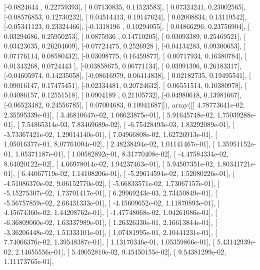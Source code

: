 \documentclass{article}
\begin{document}
       [-0.0824644 ,  0.22759393],
       [ 0.07130835,  0.11523583],
       [ 0.07324241,  0.23002565],
       [-0.08576853,  0.12730232],
       [ 0.04514413,  0.19147624],
       [ 0.02008834,  0.13119542],
       [-0.05341123,  0.23324466],
       [-0.1318196 ,  0.10294055],
       [ 0.04866296,  0.23756904],
       [ 0.03294686,  0.25950253],
       [ 0.0875936 ,  0.14710205],
       [ 0.03093389,  0.25469521],
       [ 0.03423635,  0.26204609],
       [-0.07724475,  0.2526928 ],
       [-0.04134283,  0.09300653],
       [ 0.07176114,  0.08580432],
       [-0.03098775,  0.16459877],
       [ 0.00717934,  0.16380784],
       [ 0.01343268,  0.0724443 ],
       [-0.03858675,  0.06771134],
       [ 0.03991396,  0.26183317],
       [-0.04605974,  0.14235058],
       [-0.08616979,  0.06414838],
       [ 0.02182735,  0.19495541],
       [ 0.09016147,  0.17475451],
       [-0.02334481,  0.20724632],
       [ 0.06551514,  0.10380978],
       [ 0.04086157,  0.12551518],
       [ 0.0904189 ,  0.21105732],
       [-0.04980618,  0.13981667],
       [-0.06523482,  0.24556785],
       [ 0.07004683,  0.10941687]]), array([[  4.78773641e-02,   2.35595339e-01],
       [  3.46810647e-02,   1.06623875e-01],
       [  5.91645748e-02,   1.75039288e-01],
       [  7.54865314e-03,   7.83469689e-02],
       [ -6.75428493e-03,   1.83292089e-01],
       [ -3.73367421e-02,   1.29014140e-01],
       [  7.04966808e-02,   1.62726913e-01],
       [  1.05016377e-01,   8.07761004e-02],
       [  2.48238494e-02,   1.01141467e-01],
       [  1.35951152e-01,   1.05371187e-01],
       [  1.00582892e-01,   8.31770408e-02],
       [ -4.47584334e-02,   8.64020122e-02],
       [  4.66978014e-02,   1.94237463e-01],
       [  5.94507351e-02,   1.80341721e-01],
       [  6.44067719e-02,   1.14108206e-01],
       [ -5.29614594e-02,   1.52080226e-01],
       [ -4.51086370e-02,   9.06152770e-02],
       [ -5.66833571e-02,   1.73067157e-01],
       [ -5.15275307e-02,   1.73701417e-01],
       [  6.29969243e-03,   2.73450849e-01],
       [ -5.56757859e-02,   2.66431333e-01],
       [ -4.15609652e-02,   1.11870893e-01],
       [  4.15674360e-02,   1.44208762e-01],
       [ -1.47748068e-02,   1.04261086e-01],
       [ -6.36809060e-02,   1.63337989e-01],
       [  1.26326330e-01,   2.16613844e-01],
       [ -3.36206448e-02,   1.51333101e-01],
       [  1.07481995e-01,   2.10441231e-01],
       [  7.74066376e-02,   1.39548387e-01],
       [  1.13170346e-01,   1.05359866e-01],
       [  5.43142939e-02,   2.14655556e-01],
       [  5.49052810e-02,   9.45450155e-02],
       [  9.54381299e-02,   1.11173765e-01],
\end{document}
